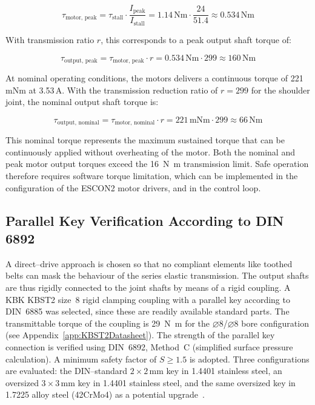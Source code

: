 \documentclass[11pt,a4paper,twoside,openright]{book}
\begin{document}
\begin{equation}
\tau_{\text{motor, peak}} = \tau_{\text{stall}} \cdot \frac{I_{\text{peak}}}{I_{\text{stall}}} = 1.14\,\text{Nm} \cdot \frac{24}{51.4} \approx 0.534\,\text{Nm}
\end{equation}

With transmission ratio $r$, this corresponds to a peak output shaft torque of:

\begin{equation}
\tau_{\text{output, peak}} = \tau_{\text{motor, peak}} \cdot r = 0.534\,\text{Nm} \cdot 299
\approx 160\,\text{Nm}
\end{equation}

At nominal operating conditions, the motors delivers a continuous torque of 221\,mNm at 3.53\,A. With the transmission reduction ratio of $r = 299$ for the shoulder joint, the nominal output shaft torque is:

\begin{equation}
\tau_{\text{output, nominal}} = \tau_{\text{motor, nominal}} \cdot r = 221\,\text{mNm} \cdot 299 \approx 66\,\text{Nm}
\end{equation}

This nominal torque represents the maximum sustained torque that can be continuously applied without overheating of the motor. Both the nominal and peak motor output torques exceed the \SI{16}{\newton\meter} transmission limit. Safe operation therefore requires software torque limitation, which can be implemented in the configuration of the ESCON2 motor drivers, and in the control loop.
\subsection{Parallel Key Verification According to DIN 6892}
\label{subsec:key_verification}
 
A direct--drive approach is chosen so that no compliant elements like toothed belts can mask the behaviour of the series elastic transmission. The output shafts are thus rigidly connected to the joint shafts by means of a rigid coupling. A KBK KBST2 size~8 rigid clamping coupling with a parallel key according to DIN~6885 was selected, since these are readily available standard parts. The transmittable torque of the coupling is \SI{29}{\newton\metre} for the $\varnothing$8/$\varnothing$8 bore configuration (see Appendix~\ref{app:KBST2Datasheet}). The strength of the parallel key connection is verified using DIN~6892, Method~C (simplified surface pressure calculation). A minimum safety factor of $S \geq 1.5$ is adopted. Three configurations are evaluated: the DIN--standard $2 \times 2$\,\si{\milli\metre} key in 1.4401 stainless steel, an oversized $3 \times 3$\,\si{\milli\metre} key in 1.4401 stainless steel, and the same oversized key in 1.7225 alloy steel (42CrMo4) as a potential upgrade~\cite{ParallelKeysSelectable}.
 
\end{document}
